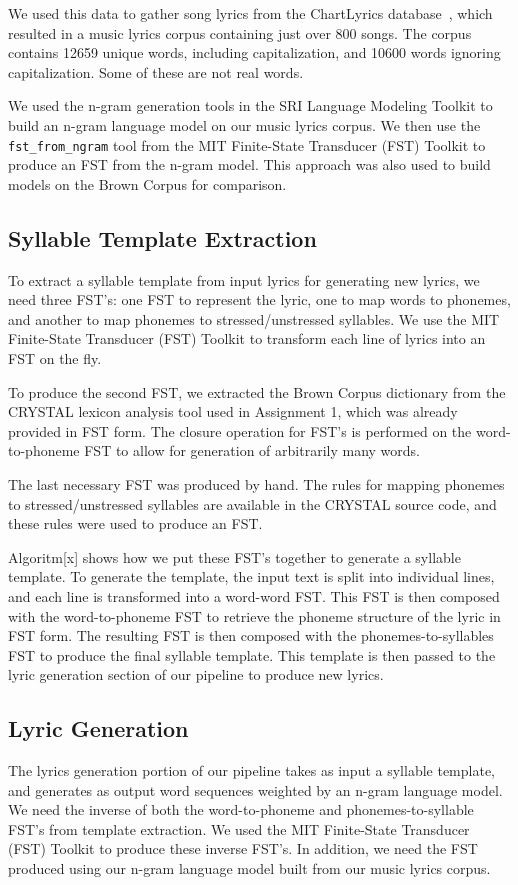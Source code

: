 \documentclass{vgtc}                          %
\begin{document}
We used this data to gather song lyrics from the ChartLyrics database~\cite{chartlyrics},
which resulted in a music lyrics corpus containing just over 800 songs. The corpus
contains 12659 unique words, including capitalization, and 10600 words
ignoring capitalization. Some of these are not real words.

We used the n-gram generation tools in the SRI Language Modeling Toolkit to build
an n-gram language model on our music lyrics corpus. We then use the
\texttt{fst\_from\_ngram} tool from
the MIT Finite-State Transducer (FST) Toolkit to produce
an FST from the n-gram model. This approach was also used to build
models on the Brown Corpus for comparison.

\subsection{Syllable Template Extraction}
To extract a syllable template from input lyrics for generating
new lyrics, we need three FST's: one FST to represent the lyric,
one to map words to phonemes, and
another to map phonemes to stressed/unstressed syllables.
We use the MIT Finite-State Transducer (FST) Toolkit
to transform each line of lyrics into an FST on the fly.

To produce the second FST, we extracted
the Brown Corpus dictionary from the CRYSTAL lexicon
analysis tool used in Assignment 1, which was already
provided in FST form. The closure operation for FST's
is performed on the word-to-phoneme FST to allow for
generation of arbitrarily many words.

The last necessary FST was produced by hand. The rules for mapping
phonemes to stressed/unstressed syllables
are available in the CRYSTAL source code, and these
rules were used to produce an FST.

Algoritm[x] shows how we put these FST's together to generate a syllable template.
To generate the template, the input text is split into individual lines, and
each line is transformed into a word-word FST.
This FST is then composed with the word-to-phoneme FST
to retrieve the phoneme structure of the lyric in FST
form. The resulting FST is then composed with the phonemes-to-syllables
FST to produce the final syllable template. This template is then
passed to the lyric generation section of our pipeline to produce
new lyrics.

\subsection{Lyric Generation}
The lyrics generation portion of our pipeline takes as input
a syllable template, and generates as output word sequences
weighted by an n-gram language model. We need the inverse
of both the word-to-phoneme and phonemes-to-syllable
FST's from template extraction. We used the MIT Finite-State
Transducer (FST) Toolkit to produce these inverse FST's.
In addition, we need the FST produced using our n-gram language
model built from our music lyrics corpus.
\end{document}
